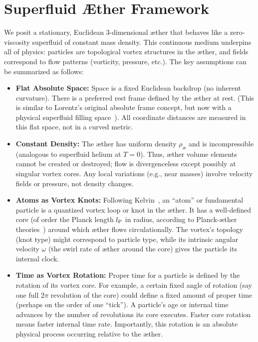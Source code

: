 
\section{Superfluid Æther Framework}

We posit a stationary, Euclidean 3-dimensional æther that behaves like a zero-viscosity superfluid of constant mass density. This continuous medium underpins all of physics: particles are topological vortex structures in the æther, and fields correspond to flow patterns (vorticity, pressure, etc.). The key assumptions can be summarized as follows:

\begin{itemize}
    \item \textbf{Flat Absolute Space:} Space is a fixed Euclidean backdrop (no inherent curvature). There is a preferred rest frame defined by the æther at rest. (This is similar to Lorentz’s original absolute frame concept, but now with a physical superfluid filling space~\cite{Winterberg2002-PlanckAether}). All coordinate distances are measured in this flat space, not in a curved metric.

    \item \textbf{Constant Density:} The æther has uniform density $\rho_{\text{\ae}}$ and is incompressible (analogous to superfluid helium at $T=0$). Thus, æther volume elements cannot be created or destroyed; flow is divergenceless except possibly at singular vortex cores. Any local variations (e.g., near masses) involve velocity fields or pressure, not density changes.

    \item \textbf{Atoms as Vortex Knots:} Following Kelvin~\cite{Kelvin1867-vortex}, an “atom” or fundamental particle is a quantized vortex loop or knot in the æther. It has a well-defined core (of order the Planck length $l_{\textrm P}$ in radius, according to Planck-æther theories~\cite{Winterberg2002-PlanckAether}) around which æther flows circulationally. The vortex’s topology (knot type) might correspond to particle type, while its intrinsic angular velocity $\omega$ (the swirl rate of æther around the core) gives the particle its internal clock.

    \item \textbf{Time as Vortex Rotation:} Proper time for a particle is defined by the rotation of its vortex core. For example, a certain fixed angle of rotation (say one full $2\pi$ revolution of the core) could define a fixed amount of proper time (perhaps on the order of one “tick”). A particle’s age or internal time advances by the number of revolutions its core executes. Faster core rotation means faster internal time rate. Importantly, this rotation is an absolute physical process occurring relative to the æther.


\end{itemize}
